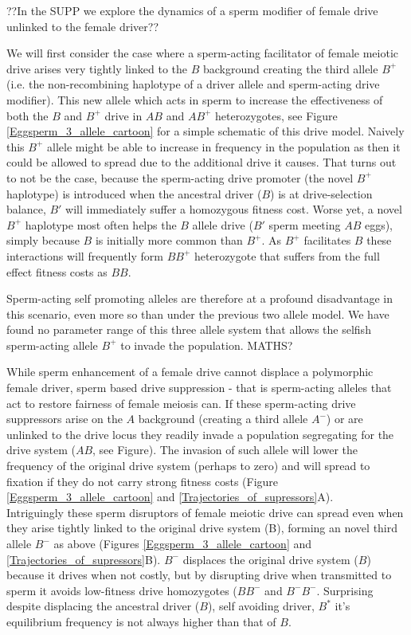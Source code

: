 \documentclass[12pt,letterpaper]{article}
\newcommand{\yb}[1]{{ \color{blue} #1}}
\begin{document}
\yb{??In the SUPP we explore the dynamics of a sperm modifier of female drive unlinked to the female driver??} 


We will first consider the case where a sperm-acting facilitator of
female meiotic drive arises very tightly linked to the $B$ background 
creating the third allele $B^{+}$ (i.e. the non-recombining haplotype of a
        driver allele and sperm-acting drive modifier). 
This new allele which acts in sperm to increase the effectiveness of both
the $B$ and  $B^{+}$ drive in $AB$ and $AB^{+}$ heterozygotes, see Figure \ref{Eggsperm_3_allele_cartoon} for a simple schematic of this drive model.  
Naively this $B^{+}$ allele might be able to increase in frequency in the
population as then it could be allowed to spread due to the additional
drive it causes.
That turns out to not be the case, 
because the sperm-acting drive promoter (the novel $B^{+}$ haplotype) 
is introduced when the ancestral driver ($B$) is at drive-selection balance, 
	$B'$ will immediately suffer a homozygous fitness cost.  
Worse yet, a novel $B^{+}$ haplotype most often helps 
the $B$  allele drive ($B'$ sperm meeting $AB$ eggs), simply because $B$ is initially more common than $B^{+}$.
As $B^{+}$ facilitates $B$ these interactions will frequently form 
	$BB^{+}$ heterozygote that suffers from the full
	effect fitness costs as $BB$. 

Sperm-acting self promoting alleles are therefore at a profound disadvantage
in this scenario, even more so than under the previous two allele model.
We have found no parameter range of this
three allele system that allows the selfish sperm-acting allele $B^{+}$ to
invade the population. \yb{MATHS?}

While  sperm enhancement of a female drive cannot displace a polymorphic female driver, sperm based drive suppression - that is sperm-acting alleles that act to restore 
fairness of female meiosis can. 
 If these sperm-acting drive suppressors arise on
	the $A$ background (creating a third allele $A^{-}$) 
or are unlinked to the drive locus they readily invade a population segregating
for the drive system ($AB$, see Figure). The invasion of such allele
will lower the frequency of the original drive system (perhaps to zero)
and will spread to fixation if they do not carry strong fitness costs
(Figure \ref{Eggsperm_3_allele_cartoon} and \ref{Trajectories_of_supressors}A). \\


Intriguingly these sperm disruptors of female meiotic drive can spread
	even when they arise tightly linked to the original drive system (B), forming
	an novel third allele $B^{-}$ as above (Figures \ref{Eggsperm_3_allele_cartoon} and \ref{Trajectories_of_supressors}B). 
$B^{-}$ displaces the original drive system ($B$) because it drives when not costly, 
	but by disrupting drive when transmitted to sperm it avoids low-fitness drive homozygotes ($BB^-$ and $B^-B^-$. 
Surprising despite displacing the ancestral driver ($B$), self avoiding driver, $B^*$ it's equilibrium frequency is not always higher than that of $B$. 
\end{document}
